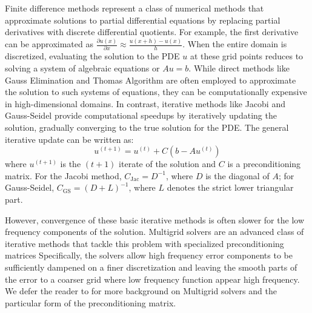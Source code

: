 \documentclass{article} %
\begin{document}
Finite difference methods \citep{smith1985numerical,leveque2007finite} represent a class of numerical methods that approximate solutions to partial differential equations by replacing partial derivatives with discrete differential quotients. For example, the first derivative can be approximated as $\frac{\partial u(x)}{\partial x} \approx \frac{u(x + h) - u(x)}{h}$. When the entire domain is discretized,  evaluating the solution to the PDE $u$ at these grid points reduces to solving a system of algebraic equations or $Au = b$. While direct methods like Gauss Elimination and Thomas Algorithm are often employed to approximate the solution to such systems of equations, they can be computationally expensive in high-dimensional domains. In contrast, iterative methods like Jacobi and Gauss-Seidel provide computational speedups by iteratively updating the solution, gradually converging to the true solution for the PDE. The general iterative update can be written as:
\begin{equation}\label{eq:iterativeupdate}
    u^{(t + 1)} = u^{(t)} + C\left(b - Au^{(t)}\right)
\end{equation}
where $u^{(t + 1)}$ is the $(t + 1)$ iterate of the solution and $C$ is a preconditioning matrix. For the Jacobi method, $C_\mathrm{Jac} = D^{-1}$, where $D$ is the diagonal of $A$; for Gauss-Seidel, $C_\mathrm{GS} = (D + L)^{-1}$, where $L$ denotes the strict lower triangular part. 

However, convergence of these basic iterative methods is often slower for the low frequency components of the solution. Multigrid solvers \citep{briggs2000multigrid,trottenberg2001multigrid,hackbusch2013multi} are an advanced class of iterative methods that tackle this problem with specialized preconditioning matrices  Specifically, the solvers allow high frequency error components to be sufficiently dampened on a finer discretization and leaving the smooth parts of the error to a coarser grid where low frequency function appear high frequency. We defer the reader to  for more background on Multigrid solvers and the particular form of the preconditioning matrix.

\end{document}
